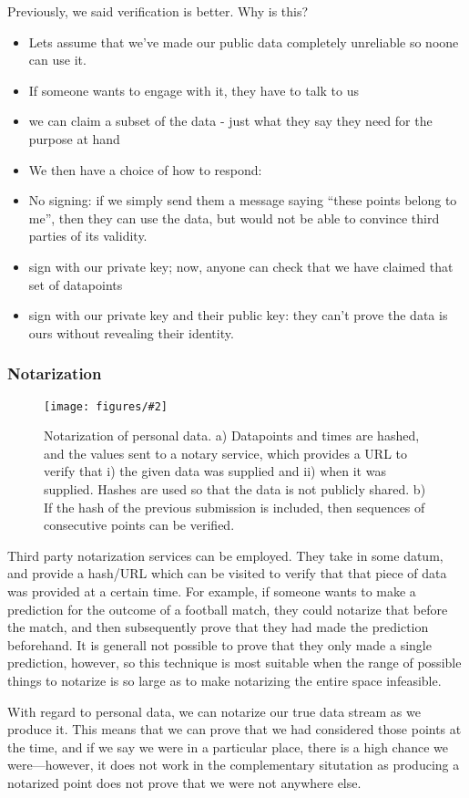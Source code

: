 \documentclass{IOS-Book-Article}     %
\newcommand{\fig}[3][0.9]{
\begin{figure}[tp]
\begin{center}
\texttt{[image: figures/\#2]}
\caption{#3}
\label{fig:#2}
\end{center}
\end{figure}
}
\begin{document}
Previously, we said verification is better. Why is this?

\begin{itemize}
  \item Lets assume that we've made our public data completely unreliable so noone can
use it.
\item If someone wants to engage with it, they have to talk to us
\item we can claim a subset of the data - just what they say they need for the
purpose at hand
\item We then have a choice of how to respond:
\item No signing: if we simply send them a message saying ``these
points belong to me'', then they can use the data, but would not be able to
convince third parties of its validity.
\item sign with our private key; now, anyone can check that we have claimed that set of datapoints
\item sign with our private key and their public key: they can't prove the data
is ours without revealing their identity.
\end{itemize}

\subsubsection{Notarization}
\fig{Notarization}{Notarization of personal data. a) Datapoints and times are
hashed, and the values sent to a notary service, which provides a URL to verify
that i) the given data was supplied and ii) when it was supplied. Hashes are
used so that the data is not publicly shared. b) If the hash of the previous
submission is included, then sequences of consecutive points can be verified.}

Third party notarization services can be employed. They take
in some datum, and provide a hash/URL which can be visited to verify that that piece of data was
provided at a certain time. For example, if someone wants to make a prediction
for the outcome of a football match, they could notarize that before the match,
and then subsequently prove that they had made the prediction beforehand. It is
generall not possible to prove that they only made a single prediction, however,
so this technique is most suitable when the range of possible things to notarize
is so large as to make notarizing the entire space infeasible.

With regard to personal data, we can notarize our true data stream as we produce
it. This means that we can prove that we had considered those points at the
time, and if we say we were in a particular place, there is a high chance we
were---however, it does not work in the complementary situtation as producing a
notarized point does not prove that we were not anywhere else.
\end{document}
